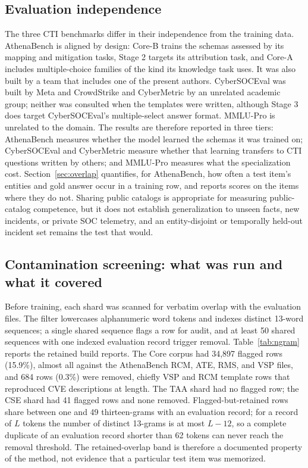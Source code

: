 \documentclass[a4paper,fleqn]{cas-dc}
\begin{document}
\subsection{Evaluation independence}\label{sec:independence}
The three CTI benchmarks differ in their independence from the training data. AthenaBench is aligned by design: Core-B trains the schemas assessed by its mapping and mitigation tasks, Stage 2 targets its attribution task, and Core-A includes multiple-choice families of the kind its knowledge task uses. It was also built by a team that includes one of the present authors. CyberSOCEval was built by Meta and CrowdStrike and CyberMetric by an unrelated academic group; neither was consulted when the templates were written, although Stage 3 does target CyberSOCEval's multiple-select answer format. MMLU-Pro is unrelated to the domain. The results are therefore reported in three tiers: AthenaBench measures whether the model learned the schemas it was trained on; CyberSOCEval and CyberMetric measure whether that learning transfers to CTI questions written by others; and MMLU-Pro measures what the specialization cost. Section~\ref{sec:overlap} quantifies, for AthenaBench, how often a test item's entities and gold answer occur in a training row, and reports scores on the items where they do not. Sharing public catalogs is appropriate for measuring public-catalog competence, but it does not establish generalization to unseen facts, new incidents, or private SOC telemetry, and an entity-disjoint or temporally held-out incident set remains the test that would.

\subsection{Contamination screening: what was run and what it covered}\label{sec:contamination}
Before training, each shard was scanned for verbatim overlap with the evaluation files. The filter lowercases alphanumeric word tokens and indexes distinct 13-word sequences; a single shared sequence flags a row for audit, and at least 50 shared sequences with one indexed evaluation record trigger removal. Table~\ref{tab:ngram} reports the retained build reports. The Core corpus had 34,897 flagged rows (15.9\%), almost all against the AthenaBench RCM, ATE, RMS, and VSP files, and 684 rows (0.3\%) were removed, chiefly VSP and RCM template rows that reproduced CVE descriptions at length. The TAA shard had no flagged row; the CSE shard had 41 flagged rows and none removed. Flagged-but-retained rows share between one and 49 thirteen-grams with an evaluation record; for a record of $L$ tokens the number of distinct 13-grams is at most $L-12$, so a complete duplicate of an evaluation record shorter than 62 tokens can never reach the removal threshold. The retained-overlap band is therefore a documented property of the method, not evidence that a particular test item was memorized.
\end{document}
